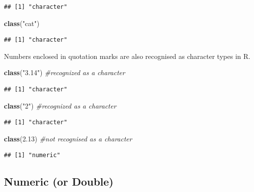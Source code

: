 \documentclass[
]{book}
\newenvironment{Shaded}{\begin{snugshade}}{\end{snugshade}}
\newcommand{\CommentTok}[1]{\textcolor[rgb]{0.56,0.35,0.01}{\textit{#1}}}
\newcommand{\FloatTok}[1]{\textcolor[rgb]{0.00,0.00,0.81}{#1}}
\newcommand{\FunctionTok}[1]{\textcolor[rgb]{0.13,0.29,0.53}{\textbf{#1}}}
\newcommand{\NormalTok}[1]{#1}
\newcommand{\StringTok}[1]{\textcolor[rgb]{0.31,0.60,0.02}{#1}}
\begin{document}
\begin{verbatim}
## [1] "character"
\end{verbatim}

\begin{Shaded}
\begin{Highlighting}[]
\FunctionTok{class}\NormalTok{(}\StringTok{"cat"}\NormalTok{)}
\end{Highlighting}
\end{Shaded}

\begin{verbatim}
## [1] "character"
\end{verbatim}

Numbers enclosed in quotation marks are also recognised as character types in R.

\begin{Shaded}
\begin{Highlighting}[]
\FunctionTok{class}\NormalTok{(}\StringTok{"3.14"}\NormalTok{) }\CommentTok{\#recognized as a character}
\end{Highlighting}
\end{Shaded}

\begin{verbatim}
## [1] "character"
\end{verbatim}

\begin{Shaded}
\begin{Highlighting}[]
\FunctionTok{class}\NormalTok{(}\StringTok{"2"}\NormalTok{) }\CommentTok{\#recognized as a character}
\end{Highlighting}
\end{Shaded}

\begin{verbatim}
## [1] "character"
\end{verbatim}

\begin{Shaded}
\begin{Highlighting}[]
\FunctionTok{class}\NormalTok{(}\FloatTok{2.13}\NormalTok{) }\CommentTok{\#not recognised as a character}
\end{Highlighting}
\end{Shaded}

\begin{verbatim}
## [1] "numeric"
\end{verbatim}

\hypertarget{numeric-or-double}{%
\subsection{Numeric (or Double)}\label{numeric-or-double}}
\end{document}
